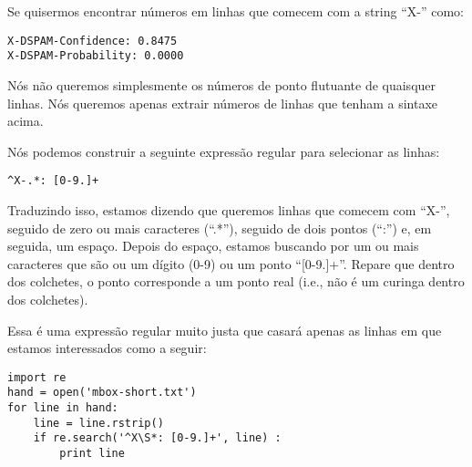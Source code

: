 Se quisermos encontrar números em linhas que comecem com a string ``X-'' como:

\beforeverb
\begin{verbatim}
X-DSPAM-Confidence: 0.8475
X-DSPAM-Probability: 0.0000  
\end{verbatim}
\afterverb
%

Nós não queremos simplesmente os números de ponto flutuante de quaisquer
linhas. Nós queremos apenas extrair números de linhas que tenham a sintaxe
acima.

Nós podemos construir a seguinte expressão regular para selecionar as linhas:

\beforeverb
\begin{verbatim}
^X-.*: [0-9.]+
\end{verbatim}
\afterverb
%

Traduzindo isso, estamos dizendo que queremos linhas que comecem com ``X-'',
seguido de zero ou mais caracteres (``.*''), seguido de dois pontos (``:'') e,
em seguida, um espaço. Depois do espaço, estamos buscando por um ou mais
caracteres que são ou um dígito (0-9) ou um ponto ``[0-9.]+''. Repare que
dentro dos colchetes, o ponto corresponde a um ponto real (i.e., não é um
curinga dentro dos colchetes).

Essa é uma expressão regular muito justa que casará apenas as linhas em que
estamos interessados como a seguir:

\beforeverb
\begin{verbatim}
import re
hand = open('mbox-short.txt')
for line in hand:
    line = line.rstrip()
    if re.search('^X\S*: [0-9.]+', line) :
        print line
\end{verbatim}
\afterverb
%

